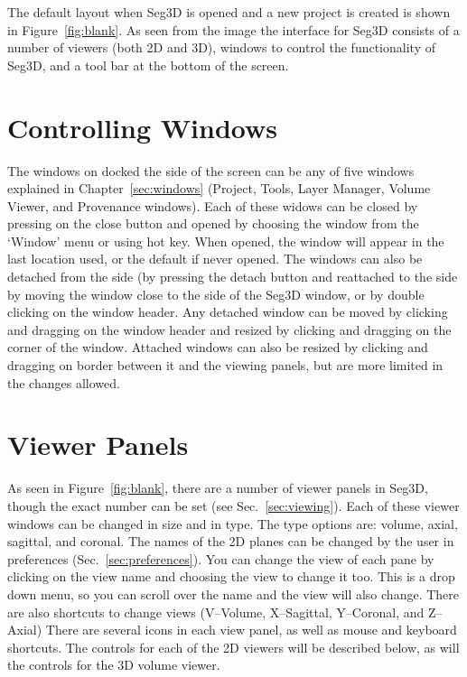 \documentclass[fleqn,11pt,openany]{book}
\begin{document}
The default layout when Seg3D is opened and a new project is created is shown in Figure~\ref{fig:blank}.  As seen from the image the interface for Seg3D consists of a number of viewers (both 2D and 3D), windows to control the functionality of Seg3D, and a tool bar at the bottom of the screen.  

\section{Controlling Windows}
\label{sec:window_control}

The windows on docked the side of the screen can be any of five windows explained in Chapter~\ref{sec:windows} (Project, Tools, Layer Manager, Volume Viewer, and Provenance windows).  Each of these widows can be closed by pressing on the close button  and opened by choosing the window from the `Window' menu or using hot key.  When opened, the window will appear in the last location used, or the default if never opened.  The windows can also be detached from the side (by pressing the detach button  and reattached to the side by moving the window close to the side of the Seg3D window, or by double clicking on the window header.  Any detached window can be moved by clicking and dragging on the window header and resized by clicking and dragging on the corner of the window.  Attached windows can also be resized by clicking and dragging on border between it and the viewing panels, but are more limited in the changes allowed.  

\section{Viewer Panels}

As seen in Figure~\ref{fig:blank}, there are a number of viewer panels in Seg3D, though the exact number can be set (see Sec.~\ref{sec:viewing}).  Each of these viewer windows can be changed in size and in type.  The type options are: volume, axial, sagittal, and coronal. The names of the 2D planes can be changed by the user in preferences (Sec.~\ref{sec:preferences}).  You can change the view of each pane by clicking on the view name and choosing the view to change it too.  This is a drop down menu, so you can scroll over the name and the view will also change.  There are also shortcuts to change views (V--Volume, X--Sagittal, Y--Coronal, and Z--Axial) There are several icons in each view panel, as well as mouse and keyboard shortcuts.  The controls for each of the 2D viewers will be described below, as will the controls for the 3D volume viewer.
\end{document}
